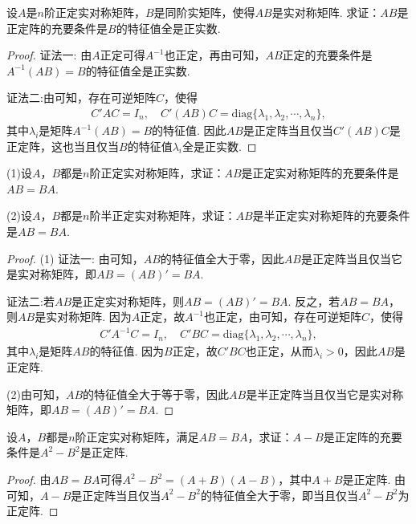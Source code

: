 \documentclass[../../main.tex]{subfiles}
\begin{document}
\begin{proposition}\label{proposition:例9.66}
设\(A\)是\(n\)阶正定实对称矩阵，\(B\)是同阶实矩阵，使得\(AB\)是实对称矩阵. 求证：\(AB\)是正定阵的充要条件是\(B\)的特征值全是正实数.
\end{proposition}
\begin{proof}
{\color{blue}证法一:}
由\(A\)正定可得\(A^{-1}\)也正定，再由可知，\(AB\)正定的充要条件是\(A^{-1}(AB) = B\)的特征值全是正实数.

{\color{blue}证法二:}由可知，存在可逆矩阵\(C\)，使得
\begin{align*}
C'AC = I_n,\quad C'(AB)C = \mathrm{diag}\{\lambda_1,\lambda_2,\cdots,\lambda_n\},
\end{align*}
其中\(\lambda_i\)是矩阵\(A^{-1}(AB)=B\)的特征值. 因此\(AB\)是正定阵当且仅当\(C'(AB)C\)是正定阵，这也当且仅当\(B\)的特征值\(\lambda_i\)全是正实数.
\end{proof}

\begin{proposition}\label{proposition:例9.67}
(1)设\(A\)，\(B\)都是\(n\)阶正定实对称矩阵，求证：\(AB\)是正定实对称矩阵的充要条件是\(AB = BA\).

(2)设\(A\)，\(B\)都是\(n\)阶半正定实对称矩阵，求证：\(AB\)是半正定实对称矩阵的充要条件是\(AB = BA\).
\end{proposition}
\begin{proof}
(1)
{\color{blue}证法一:}
由可知，\(AB\)的特征值全大于零，因此\(AB\)是正定阵当且仅当它是实对称矩阵，即\(AB = (AB)' = BA\).

{\color{blue}证法二:}若\(AB\)是正定实对称矩阵，则\(AB=(AB)' = BA\). 反之，若\(AB = BA\)，则\(AB\)是实对称矩阵. 因为\(A\)正定，故\(A^{-1}\)也正定，由可知，存在可逆矩阵\(C\)，使得
\begin{align*}
C'A^{-1}C = I_n,\quad C'BC = \mathrm{diag}\{\lambda_1,\lambda_2,\cdots,\lambda_n\},
\end{align*}
其中\(\lambda_i\)是矩阵\(AB\)的特征值. 因为\(B\)正定，故\(C'BC\)也正定，从而\(\lambda_i>0\)，因此\(AB\)是正定阵. 

(2)由可知，\(AB\)的特征值全大于等于零，因此\(AB\)是半正定阵当且仅当它是实对称矩阵，即\(AB=(AB)' = BA\). 
\end{proof}

\begin{proposition}\label{proposition:例9.68}
设\(A\)，\(B\)都是\(n\)阶正定实对称矩阵，满足\(AB = BA\)，求证：\(A - B\)是正定阵的充要条件是\(A^2 - B^2\)是正定阵.
\end{proposition}
\begin{proof}
由\(AB = BA\)可得\(A^2 - B^2 = (A + B)(A - B)\)，其中\(A + B\)是正定阵. 由可知，\(A - B\)是正定阵当且仅当\(A^2 - B^2\)的特征值全大于零，即当且仅当\(A^2 - B^2\)为正定阵.
\end{proof}
\end{document}
